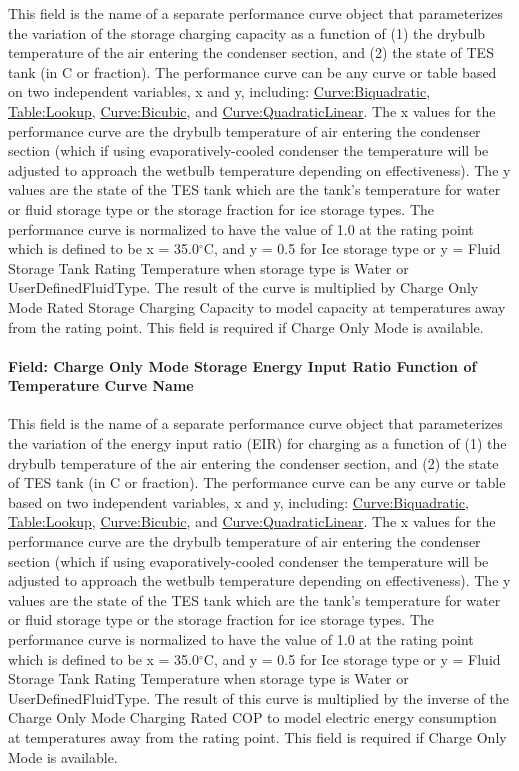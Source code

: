 This field is the name of a separate performance curve object that parameterizes the variation of the storage charging capacity as a function of (1) the drybulb temperature of the air entering the condenser section, and (2) the state of TES tank (in C or fraction). The performance curve can be any curve or table based on two independent variables, x and y, including: \hyperref[curvebiquadratic]{Curve:Biquadratic}, \hyperref[tablelookup]{Table:Lookup}, \hyperref[curvebicubic]{Curve:Bicubic}, and \hyperref[curvequadraticlinear]{Curve:QuadraticLinear}. The x values for the performance curve are the drybulb temperature of air entering the condenser section (which if using evaporatively-cooled condenser the temperature will be adjusted to approach the wetbulb temperature depending on effectiveness). The y values are the state of the TES tank which are the tank's temperature for water or fluid storage type or the storage fraction for ice storage types. The performance curve is normalized to have the value of 1.0 at the rating point which is defined to be x = 35.0$^\circ$C, and y = 0.5 for Ice storage type or y = Fluid Storage Tank Rating Temperature when storage type is Water or UserDefinedFluidType. The result of the curve is multiplied by Charge Only Mode Rated Storage Charging Capacity to model capacity at temperatures away from the rating point. This field is required if Charge Only Mode is available.

\paragraph{Field: Charge Only Mode Storage Energy Input Ratio Function of Temperature Curve Name}\label{field-charge-only-mode-storage-energy-input-ratio-function-of-temperature-curve-name}

This field is the name of a separate performance curve object that parameterizes the variation of the energy input ratio (EIR) for charging as a function of (1) the drybulb temperature of the air entering the condenser section, and (2) the state of TES tank (in C or fraction). The performance curve can be any curve or table based on two independent variables, x and y, including: \hyperref[curvebiquadratic]{Curve:Biquadratic}, \hyperref[tablelookup]{Table:Lookup}, \hyperref[curvebicubic]{Curve:Bicubic}, and \hyperref[curvequadraticlinear]{Curve:QuadraticLinear}. The x values for the performance curve are the drybulb temperature of air entering the condenser section (which if using evaporatively-cooled condenser the temperature will be adjusted to approach the wetbulb temperature depending on effectiveness). The y values are the state of the TES tank which are the tank's temperature for water or fluid storage type or the storage fraction for ice storage types. The performance curve is normalized to have the value of 1.0 at the rating point which is defined to be x = 35.0$^\circ$C, and y = 0.5 for Ice storage type or y = Fluid Storage Tank Rating Temperature when storage type is Water or UserDefinedFluidType. The result of this curve is multiplied by the inverse of the Charge Only Mode Charging Rated COP to model electric energy consumption at temperatures away from the rating point. This field is required if Charge Only Mode is available.

